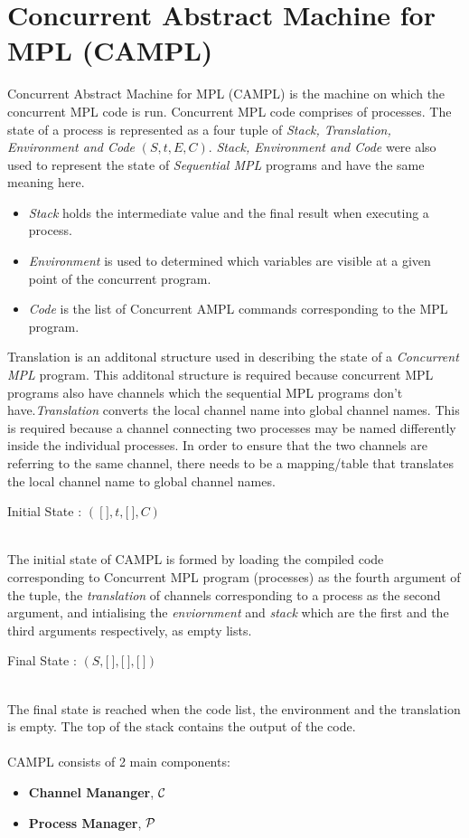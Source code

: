 \documentclass[11pt]{article}
\newcommand{\<}{\langle}
\renewcommand{\>}{\rangle}
\begin{document}
\section {Concurrent Abstract Machine for MPL (CAMPL)}
Concurrent Abstract Machine for MPL (CAMPL) is the machine on which the concurrent MPL code is run. Concurrent MPL code comprises of processes. The state of a process is represented as a four tuple of {\em Stack, Translation, Environment and Code} $(S,t,E,C)$. {\em Stack, Environment and Code} were also used to represent the state of {\em Sequential MPL} programs and have the same meaning here. 
\begin{itemize}
  \item {\em Stack} holds the intermediate value and the final result when executing a process.
  \item {\em Environment} is used to determined which variables are visible at a given point of the concurrent program.
  \item {\em Code} is the list of Concurrent AMPL commands corresponding to the MPL program.
\end{itemize}
Translation is an additonal structure used in describing the state of a {\em Concurrent MPL} program. This additonal structure is required because concurrent MPL programs also have channels which the sequential MPL programs don't have.{\em Translation} converts the local channel name into global channel names. This is required because a channel connecting two processes may be named differently inside the individual processes. In order to ensure that the two channels are referring to the same channel, there needs to be a mapping/table that translates the local channel name to global channel names.
\begin{center}
Initial State : $(~\lbrack~\rbrack,t,\lbrack~\rbrack,C)$
\end{center}
~~\\
The initial state of CAMPL is formed by loading the compiled code corresponding to Concurrent MPL program (processes) as the fourth argument of the tuple, the {\em translation} of channels corresponding to a process as the second argument, and intialising the {\em enviornment} and {\em stack} which are the first and the third arguments respectively, as empty lists.
~~\\
\begin{center}
Final State : $(S,\lbrack~\rbrack,\lbrack~\rbrack,\lbrack~\rbrack)$
\end{center}
~~\\
The final state is reached when the code list, the environment and the translation is empty. The top of the stack contains the output of the code.
~~\\~~\\
CAMPL consists of 2 main components:
\begin{itemize}
    \item {\bf Channel Mananger}, $\cal C$
    \item {\bf Process Manager}, $\cal P$
\end{itemize}
\end{document}
